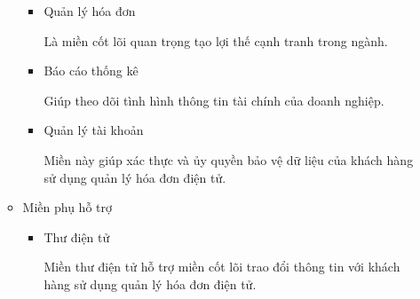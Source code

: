 \begin{itemize}
\begin{itemize}
\begin{itemize}

\item Quản lý hóa đơn

Là miền cốt lõi quan trọng tạo lợi thế cạnh tranh trong ngành.

\item Báo cáo thống kê

Giúp theo dõi tình hình thông tin tài chính của doanh nghiệp.



\item Quản lý tài khoản


Miền này giúp xác thực và ủy quyền bảo vệ dữ liệu của khách hàng sử dụng quản lý hóa đơn điện tử.

\end{itemize}

\item Miền phụ hỗ trợ

\begin{itemize}

\item Thư điện tử

Miền thư điện tử hỗ trợ miền cốt lõi trao đổi thông tin với khách hàng sử dụng quản lý hóa đơn điện tử.

\end{itemize}

\end{itemize}

\end{itemize}